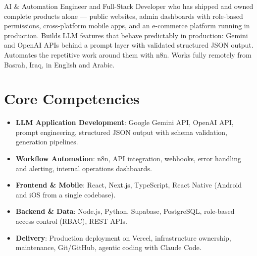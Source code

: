 \documentclass[11pt,a4paper,sans]{moderncv}
\begin{document}
\makecvtitle


\vspace{6pt}
\small{AI \& Automation Engineer and Full-Stack Developer who has shipped and owned complete
products alone --- public websites, admin dashboards with role-based permissions, cross-platform
mobile apps, and an e-commerce platform running in production. Builds LLM features that behave
predictably in production: Gemini and OpenAI APIs behind a prompt layer with validated structured
JSON output. Automates the repetitive work around them with n8n. Works fully remotely from Basrah,
Iraq, in English and Arabic.}


\section{Core Competencies}
\vspace{1pt}
\begin{itemize}

\item \textbf{LLM Application Development}: Google Gemini API, OpenAI API, prompt engineering,
structured JSON output with schema validation, generation pipelines.

\item \textbf{Workflow Automation}: n8n, API integration, webhooks, error handling and alerting,
internal operations dashboards.

\item \textbf{Frontend \& Mobile}: React, Next.js, TypeScript, React Native (Android and iOS from
a single codebase).

\item \textbf{Backend \& Data}: Node.js, Python, Supabase, PostgreSQL, role-based access control
(RBAC), REST APIs.

\item \textbf{Delivery}: Production deployment on Vercel, infrastructure ownership, maintenance,
Git/GitHub, agentic coding with Claude Code.

\end{itemize}
\end{document}

